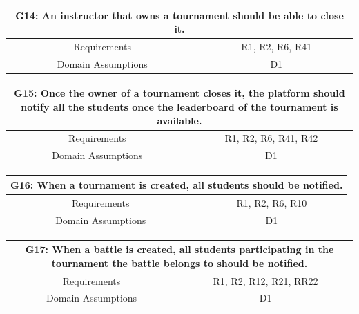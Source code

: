 \documentclass{article}
\begin{document}
\begin{table}[H]
    \centering
    \begin{tabular*}{\linewidth}{@{\extracolsep{\fill}} cc }
        \hline
        \multicolumn{2}{|c|}{\parbox{0.9\dimexpr\textwidth-2\tabcolsep\relax}{\centering\textbf{G14: An instructor that owns a tournament should be able to close it.}}} \\
        \hline
        Requirements & R1, R2, R6, R41\\
        \hline
        Domain Assumptions & D1\\
        \hline
    \end{tabular*}
\end{table}

\begin{table}[H]
    \centering
    \begin{tabular*}{\linewidth}{@{\extracolsep{\fill}} cc }
        \hline
        \multicolumn{2}{|c|}{\parbox{0.9\dimexpr\textwidth-2\tabcolsep\relax}{\centering\textbf{G15: Once the owner of a tournament closes it, the platform should notify all the students once the leaderboard of the tournament is available.}}} \\
        \hline
        Requirements & R1, R2, R6, R41, R42\\
        \hline
        Domain Assumptions & D1\\
        \hline
    \end{tabular*}
\end{table}

\begin{table}[H]
    \centering
    \begin{tabular*}{\linewidth}{@{\extracolsep{\fill}} cc }
        \hline
        \multicolumn{2}{|c|}{\parbox{0.9\dimexpr\textwidth-2\tabcolsep\relax}{\centering\textbf{G16: When a tournament is created, all students should be notified.}}} \\
        \hline
        Requirements & R1, R2, R6, R10\\
        \hline
        Domain Assumptions & D1\\
        \hline
    \end{tabular*}
\end{table}

\begin{table}[H]
    \centering
    \begin{tabular*}{\linewidth}{@{\extracolsep{\fill}} cc }
        \hline
        \multicolumn{2}{|c|}{\parbox{0.9\dimexpr\textwidth-2\tabcolsep\relax}{\centering\textbf{G17: When a battle is created, all students participating in the tournament the battle belongs to should be notified.}}} \\
        \hline
        Requirements & R1, R2, R12, R21, RR22\\
        \hline
        Domain Assumptions & D1\\
        \hline
    \end{tabular*}
\end{table}
\end{document}
